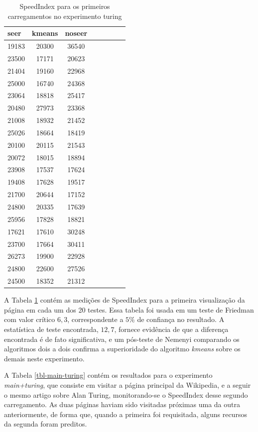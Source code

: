 \documentclass[10pt,twocolumn,letterpaper]{article}
\begin{document}
\begin{table}
\begin{center}
\begin{tabular}{l*{6}{c}r}
\hline
seer & kmeans & noseer \\
\hline
19183 & 20300 & 36540 \\
23500 & 17171 & 20623 \\
21404 & 19160 & 22968 \\
25000 & 16740 & 24368 \\
23064 & 18818 & 25417 \\
20480 & 27973 & 23368 \\
21008 & 18932 & 21452 \\
25026 & 18664 & 18419 \\
20100 & 20115 & 21543 \\
20072 & 18015 & 18894 \\
23908 & 17537 & 17624 \\
19408 & 17628 & 19517 \\
21700 & 20644 & 17152 \\
24800 & 20335 & 17639 \\
25956 & 17828 & 18821 \\
17621 & 17610 & 30248 \\
23700 & 17664 & 30411 \\
26273 & 19900 & 22928 \\
24800 & 22600 & 27526 \\
24500 & 18352 & 21312 \\
\end{tabular}
\end{center}
\caption{SpeedIndex para os primeiros carregamentos no experimento turing}
\label{tbl-turing-fvs}
\end{table}

A Tabela \ref{tbl-turing-fvs} contém as medições de SpeedIndex para a primeira visualização da página em cada um dos 20 testes. Essa tabela foi usada em um teste de Friedman com valor crítico $6,3$, correspondente a $5 \%$ de confiança no resultado. A estatística de teste encontrada, $12,7$, fornece evidência de que a diferença encontrada é de fato significativa, e um pós-teste de Nemenyi comparando os algoritmos dois a dois confirma a superioridade do algoritmo \emph{kmeans} sobre os demais neste experimento.

A Tabela \ref{tbl-main-turing} contém os resultados para o experimento \emph{main+turing}, que consiste em visitar a página principal da Wikipedia, e a seguir o mesmo artigo sobre Alan Turing, monitorando-se o SpeedIndex desse segundo carregamento. As duas páginas haviam sido visitadas próximas uma da outra anteriormente, de forma que, quando a primeira foi requisitada, alguns recursos da segunda foram preditos.
\end{document}
